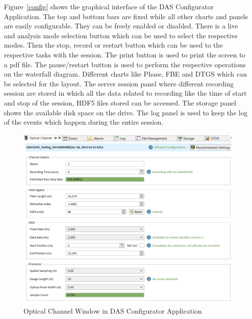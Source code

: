 Figure~\ref{config} shows the graphical interface of the DAS Configurator Application. The top and bottom bars are fixed while all other charts and panels are easily configurable. They can be freely enabled or disabled. There is a live and analysis mode selection button which can be used to select the respective modes. Then the stop, record or restart button which can be used to the respective tasks with the session. The print button is used to print the screen to a pdf file. The pause/restart button is used to perform the respective operations on the waterfall diagram. Different charts like Phase, FBE and DTGS which can be selected for the layout. The server session panel where different recording session are stored in which all the data related to recording like the time of start and stop of the session, HDF5 files stored can be accessed. The storage panel  shows the available disk space on the drive. The log panel is used to keep the log of the events which happen during the entire session. 

\begin{figure}[h]
    \centering
    \includegraphics[width=0.8\linewidth]{Bilder/jpg/optical_channel.png}
    \caption{Optical Channel Window in DAS Configurator Application}
    \label{optical}
\end{figure}

